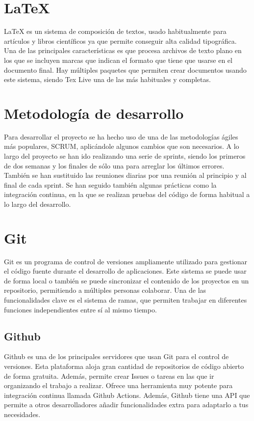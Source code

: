 \section{LaTeX}
LaTeX \cite{latex} es un sistema de composición de textos, usado habitualmente para artículos y libros científicos ya que permite conseguir alta calidad tipográfica. Una de las principales características es que procesa archivos de texto plano en los que se incluyen marcas que indican el formato que tiene que usarse en el documento final.
Hay múltiples paquetes que permiten crear documentos usando este sistema, siendo Tex Live una de las más habituales y completas.

\section{Metodología de desarrollo}
Para desarrollar el proyecto se ha hecho uso de una de las metodologías ágiles más populares, SCRUM\cite{scrum}, aplicándole algunos cambios que son necesarios. A lo largo del proyecto se han ido realizando una serie de sprints, siendo los primeros de dos semanas y los finales de sólo una para arreglar los últimos errores. También se han sustituido las reuniones diarias por una reunión al principio y al final de cada sprint. Se han seguido también algunas prácticas como la integración continua, en la que se realizan pruebas del código de forma habitual a lo largo del desarrollo.

\section{Git}
Git \cite{git} es un programa de control de versiones ampliamente utilizado para gestionar el código fuente durante el desarrollo de aplicaciones. Este sistema se puede usar de forma local o también se puede sincronizar el contenido de los proyectos en un repositorio, permitiendo a múltiples personas colaborar. Una de las funcionalidades clave es el sistema de ramas, que permiten trabajar en diferentes funciones independientes entre sí al mismo tiempo.
\subsection{Github}
Github \cite{github} es una de los principales servidores que usan Git para el control de versiones. Esta plataforma aloja gran cantidad de repositorios de código abierto de forma gratuita. Además, permite crear Issues o tareas en las que ir organizando el trabajo a realizar. Ofrece una herramienta muy potente para integración continua llamada Github Actions. Además, Github tiene una API que permite a otros desarrolladores añadir funcionalidades extra para adaptarlo a tus necesidades.
